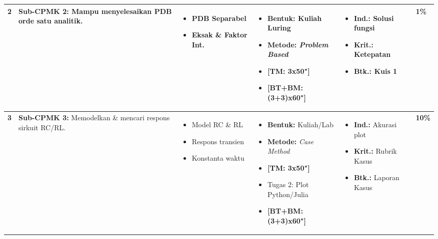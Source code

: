 \documentclass[11pt,a4paper]{article}
\begin{document}
\begin{longtable}{|C{0.6cm}|L{4.2cm}|L{4.5cm}|L{4.5cm}|L{3.5cm}|C{1.1cm}|}
\textbf{2} & \textbf{Sub-CPMK 2:} Mampu menyelesaikan PDB orde satu analitik. & \vspace{-4mm} \begin{itemize}[leftmargin=*, noitemsep] \item PDB Separabel \item Eksak \& Faktor Int. \end{itemize} \vspace{-4mm} & \vspace{-4mm} \begin{itemize}[leftmargin=*, noitemsep] \item \textbf{Bentuk:} Kuliah Luring \item \textbf{Metode:} \textit{Problem Based} \item \textbf{[TM: 3x50"]} \item \textbf{[BT+BM: (3+3)x60"]} \end{itemize} \vspace{-4mm} & \vspace{-4mm} \begin{itemize}[leftmargin=*, noitemsep] \item \textbf{Ind.:} Solusi fungsi \item \textbf{Krit.:} Ketepatan \item \textbf{Btk.:} Kuis 1 \end{itemize} \vspace{-4mm} & \textbf{1\%} \\ \hline

\textbf{3} & \textbf{Sub-CPMK 3:} Memodelkan \& mencari respons sirkuit RC/RL. & \vspace{-4mm} \begin{itemize}[leftmargin=*, noitemsep] \item Model RC \& RL \item Respons transien \item Konstanta waktu \end{itemize} \vspace{-4mm} & \vspace{-4mm} \begin{itemize}[leftmargin=*, noitemsep] \item \textbf{Bentuk:} Kuliah/Lab \item \textbf{Metode:} \textit{Case Method} \item \textbf{[TM: 3x50"]} \item Tugas 2: Plot Python/Julia \item \textbf{[BT+BM: (3+3)x60"]} \end{itemize} \vspace{-4mm} & \vspace{-4mm} \begin{itemize}[leftmargin=*, noitemsep] \item \textbf{Ind.:} Akurasi plot \item \textbf{Krit.:} Rubrik Kasus \item \textbf{Btk.:} Laporan Kasus \end{itemize} \vspace{-4mm} & \textbf{10\%} \\ \hline


\end{longtable}
\end{document}
